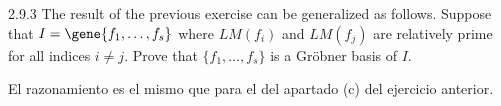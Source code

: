 \documentclass[twoside]{article}
\begin{document}
\newpage

\begin{ejercicio}{2.9.3}
The result of the previous exercise can be generalized as follows. Suppose that $I =
\gene{ f_1,\dots , f_s}$ where $LM( f_i)$ and $LM( f_j)$ are relatively prime for all indices $i \not= j$. Prove
that $\{f_1, \dots , f_s\}$ is a Gröbner basis of $I$.
\end{ejercicio}
\begin{solucion}
El razonamiento es el mismo que para el del apartado (c) del ejercicio anterior.
\end{solucion}
\end{document}
